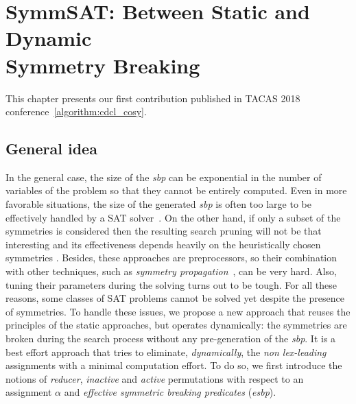 \chapter{SymmSAT: Between Static and Dynamic\\ Symmetry Breaking}\label{chap:symmSAT}
\minitoc
This chapter presents our first contribution published in TACAS 2018 conference~\ref{algorithm:cdcl_cosy}. 
\section{General idea}
In the general case,
the size of the \textit{sbp} can be exponential in the number of variables of
the problem so that they cannot be entirely computed. Even in more favorable
situations, the size of the generated \textit{sbp} is often too large to be
effectively handled by a SAT solver~\cite{Luks2004}. On the other hand, if
only a subset of the symmetries is considered then the resulting search pruning
will not be that interesting and its effectiveness depends heavily on the
heuristically chosen symmetries \cite{biere2009handbook}. Besides, these approaches
are preprocessors, so their combination with other techniques, such as
\emph{symmetry propagation}~\cite{Devriendt12}, can be very hard. Also, tuning
their parameters during the solving turns out to be tough. For all
these reasons, some classes of SAT problems cannot be solved yet despite
the presence of symmetries.
To handle these issues, we propose a new
approach that reuses the principles of the static approaches, but operates
dynamically: the symmetries are broken during the search process without any
pre-generation of the \textit{sbp}. It is a best effort approach that tries to eliminate,
\textit{dynamically}, the \textit{non lex-leading} assignments with a minimal
computation effort. To do so, we first introduce the notions of
\textit{reducer}, \textit{inactive} and \textit{active} permutations with
respect to an assignment $\alpha$ and \emph{effective symmetric breaking predicates} (\emph{esbp}).

